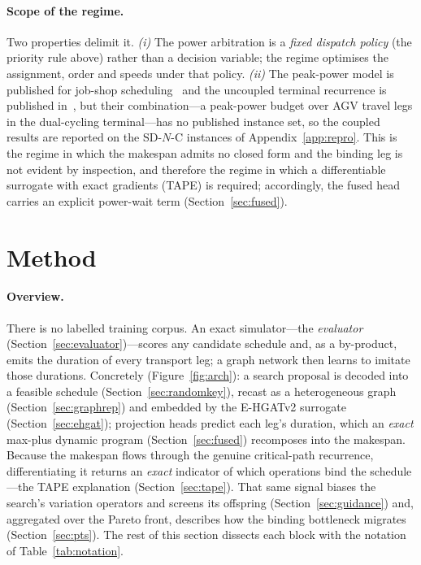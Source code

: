 \documentclass[11pt]{article}
\begin{document}
\paragraph{Scope of the regime.} Two properties delimit it. \emph{(i)} The power
arbitration is a \emph{fixed dispatch policy} (the priority rule above) rather than a decision
variable; the regime optimises the assignment, order and speeds under that policy.
\emph{(ii)} The peak-power model is published for job-shop
scheduling~\cite{homayouni2025peakpower} and the uncoupled terminal recurrence is published
in~\cite{fontes2023flowtime}, but their combination---a peak-power budget over AGV travel
legs in the dual-cycling terminal---has no published instance set, so the coupled results
are reported on the \textsf{SD-$N$-C} instances of Appendix~\ref{app:repro}. This is the
regime in which the makespan admits no closed form and the binding leg is not evident by
inspection, and therefore the regime in which a differentiable surrogate with exact
gradients (TAPE) is required; accordingly, the fused head carries an explicit power-wait
term (Section~\ref{sec:fused}).

\section{Method}
\label{sec:method}

\paragraph{Overview.} There is no labelled training corpus. An exact
simulator---the \emph{evaluator} (Section~\ref{sec:evaluator})---scores any candidate schedule
and, as a by-product, emits the duration of every transport leg; a graph network then learns
to imitate those durations. Concretely (Figure~\ref{fig:arch}): a search proposal is decoded
into a feasible schedule (Section~\ref{sec:randomkey}), recast as a heterogeneous graph
(Section~\ref{sec:graphrep}) and embedded by the E-HGATv2 surrogate (Section~\ref{sec:ehgat});
projection heads predict each leg's duration, which an \emph{exact} max-plus dynamic program
(Section~\ref{sec:fused}) recomposes into the makespan. Because the makespan flows through the
genuine critical-path recurrence, differentiating it returns an \emph{exact} indicator of
which operations bind the schedule---the TAPE explanation (Section~\ref{sec:tape}). That same
signal biases the search's variation operators and screens its offspring
(Section~\ref{sec:guidance}) and, aggregated over the Pareto front, describes how the binding
bottleneck migrates (Section~\ref{sec:pts}). The rest of this section dissects each block with
the notation of Table~\ref{tab:notation}.
\end{document}
